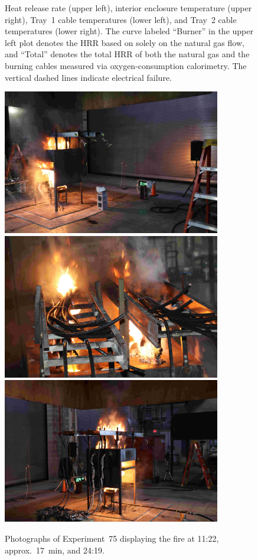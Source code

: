 \begin{figure}[H]
\caption[HRR and temperatures of Experiment 75]{Heat release rate (upper left), interior enclosure temperature (upper right), Tray~1 cable temperatures (lower left), and Tray~2 cable temperatures (lower right). The curve labeled ``Burner'' in the upper left plot denotes the HRR based on solely on the natural gas flow, and ``Total'' denotes the total HRR of both the natural gas and the burning cables measured via oxygen-consumption calorimetry. The vertical dashed lines indicate electrical failure.}
\label{fig:Test_75}
\end{figure}

\begin{figure}[p]
\centering
\includegraphics[height=2.50in]{../FIGURES/Test_75_Photo_1} \\ \vspace{0.1in}
\includegraphics[height=2.50in]{../FIGURES/Test_75_Photo_2} \\ \vspace{0.1in}
\includegraphics[height=2.50in]{../FIGURES/Test_75_Photo_3}
\caption[Photographs of Experiment~75]{Photographs of Experiment~75 displaying the fire at 11:22, approx.~17~min, and 24:19.}
\label{fig:Test_75_photos}
\end{figure}


